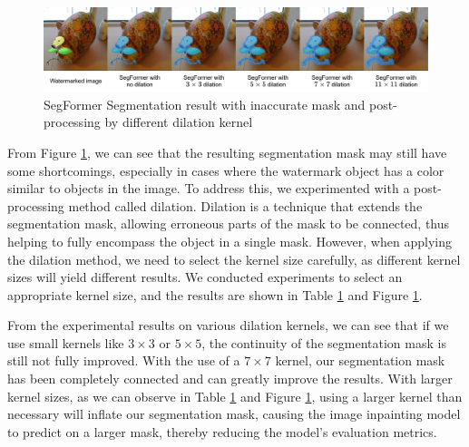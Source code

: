 \begin{figure}[t]
    \centering
    \includegraphics[width=\linewidth]{img/dilation-segformer.png}
    \caption[SegFormer Segmentation post-processing]{SegFormer Segmentation result with inaccurate mask and post-processing by different dilation kernel}
    \label{fig:segformer-no-dilate}
\end{figure}

From Figure \ref{fig:segformer-no-dilate}, we can see that the resulting segmentation mask may still have some shortcomings, especially in cases where the watermark object has a color similar to objects in the image. To address this, we experimented with a post-processing method called dilation. Dilation is a technique that extends the segmentation mask, allowing erroneous parts of the mask to be connected, thus helping to fully encompass the object in a single mask. However, when applying the dilation method, we need to select the kernel size carefully, as different kernel sizes will yield different results. We conducted experiments to select an appropriate kernel size, and the results are shown in Table \ref{fig:segformer-no-dilate} and Figure \ref{fig:segformer-no-dilate}.

From the experimental results on various dilation kernels, we can see that if we use small kernels like $3 \times 3$ or $5 \times 5$, the continuity of the segmentation mask is still not fully improved. With the use of a $7 \times 7$ kernel, our segmentation mask has been completely connected and can greatly improve the results. With larger kernel sizes, as we can observe in Table \ref{fig:segformer-no-dilate} and Figure \ref{fig:segformer-no-dilate}, using a larger kernel than necessary will inflate our segmentation mask, causing the image inpainting model to predict on a larger mask, thereby reducing the model's evaluation metrics.

